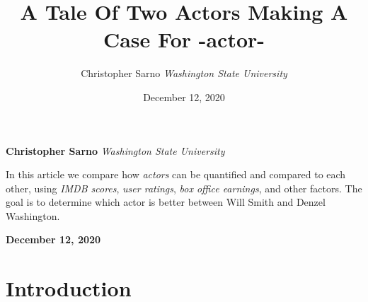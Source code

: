 \documentclass[]{article}
\title{\textbf{\textcolor{WSU.crimson}{A Tale Of Two
Actors}} \newline \textbf{\textcolor{WSU.gray}{Making A Case For
-actor-}}  }
\author{\Large Christopher
Sarno\vspace{0.05in} \newline\normalsize\emph{Washington State
University}  }
\date{December 12, 2020}
\newcommand*{\authorfont}{\fontfamily{phv}\selectfont}
\renewenvironment{abstract}
 {{%
    \setlength{\leftmargin}{0mm}
    \setlength{\rightmargin}{\leftmargin}%
  }%
  \relax}
 {\endlist}
\begin{document}
	
%    


{%
\setlength{\parindent}{0pt}
\thispagestyle{plain}
{\fontsize{18}{20}\selectfont\raggedright 
\maketitle  %

}

{
   \vskip 13.5pt\relax \normalsize\fontsize{11}{12} 
   
\textbf{\authorfont Christopher
Sarno} \hskip 15pt \emph{\small Washington State University}   

}

}








\begin{abstract}

    \hbox{\vrule height .2pt width 39.14pc}

    \vskip 8.5pt %

\noindent In this article we compare how \emph{actors} can be quantified
and compared to each other, using \emph{IMDB scores},
\emph{user ratings}, \emph{box office earnings}, and other factors. The
goal is to determine which actor is better between Will Smith and Denzel
Washington. \vspace{0.25in}


    



    
    \hbox{\vrule height .2pt width 39.14pc}
    \vskip 5pt 
    \hfill \textbf{\textcolor{WSU.gray}{ December 12, 2020 } }
    \vskip 5pt 
    
\end{abstract}


\vskip -8.5pt




\noindent  

\section{Introduction}
\label{sec:intro}
\end{document}
